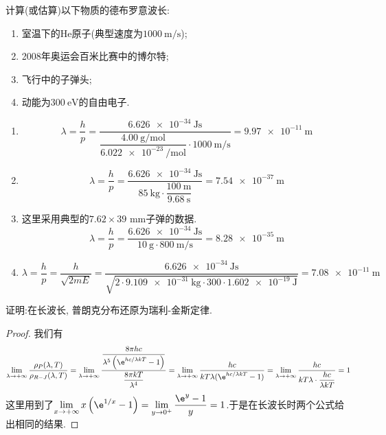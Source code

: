 \documentclass{ctexart}
\author{2400011785 蒋锦豪}
\title{\tbf{结构化学\ 第1章作业}}
\begin{document}
\maketitle
\begin{homework}[1.]
    计算(或估算)以下物质的德布罗意波长:
    \begin{enumerate}[label=(\alph*)]
        \item 室温下的He原子(典型速度为$\SI{1000}{\meter\per\second}$);
        \item 2008年奥运会百米比赛中的博尔特;
        \item 飞行中的子弹头;
        \item 动能为$\SI{300}{\electronvolt}$的自由电子.
    \end{enumerate}
\end{homework}
\begin{solution}
\begin{enumerate}[label=(\alph*)]
    \item \[\lambda=\dfrac{h}{p}=\dfrac{\SI{6.626e-34}{\joule\second}}{\dfrac{\SI{4.00}{\gram\per\mol}}{\SI{6.022e-23}{\per\mol}}\cdot\SI{1000}{\meter\per\second}}=\SI{9.97e-11}{\meter}\]
    \item \[\lambda=\dfrac{h}{p}=\dfrac{\SI{6.626e-34}{\joule\second}}{\SI{85}{\kilogram}\cdot\dfrac{\SI{100}{\meter}}{\SI{9.68}{\second}}}=\SI{7.54e-37}{\meter}\]
    \item 这里采用典型的$7.62\times39\text{ mm}$子弹的数据.
    \[\lambda=\dfrac{h}{p}=\dfrac{\SI{6.626e-34}{\joule\second}}{\SI{10}{\gram}\cdot\SI{800}{\meter\per\second}}=\SI{8.28e-35}{\meter}\]
    \item \[\lambda=\dfrac{h}{p}=\dfrac{h}{\sqrt{2mE}}=\dfrac{\SI{6.626e-34}{\joule\second}}{\sqrt{2\cdot\SI{9.109e-31}{\kilogram}\cdot300\cdot\SI{1.602e-19}{\joule}}}=\SI{7.08e-11}{\meter}\]
\end{enumerate}
\end{solution}
\begin{homework}[2.]
    证明:在长波长, 普朗克分布还原为瑞利-金斯定律.
\end{homework}
\begin{proof}
    我们有
    \[\lim_{\lambda\to+\infty}\dfrac{\rho_{P}(\lambda,T)}{\rho_{R-J}(\lambda,T)}=\lim_{\lambda\to+\infty}\dfrac{\dfrac{8\pi hc}{\lambda^5\left(\e^{hc/\lambda kT}-1\right)}}{\dfrac{8\pi kT}{\lambda^4}}=\lim_{\lambda\to+\infty}\dfrac{hc}{kT\lambda(\e^{hc/\lambda kT}-1)}=\lim_{\lambda\to+\infty}\dfrac{hc}{kT\lambda\cdot\dfrac{hc}{\lambda kT}}=1\]
    这里用到了$\displaystyle\lim_{x\to+\infty}x\left(\e^{1/x}-1\right)=\lim_{y\to0^+}\dfrac{\e^y-1}{y}=1$.于是在长波长时两个公式给出相同的结果.
\end{proof}
\end{document}
